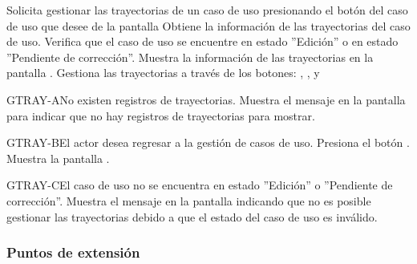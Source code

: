 \begin{UCtrayectoria}
	\UCpaso[\UCactor] Solicita gestionar las trayectorias de un caso de uso presionando el botón  del caso de uso que desee de la pantalla 
	\UCpaso[\UCsist] Obtiene la información de las trayectorias del caso de uso. 
	\UCpaso[\UCsist] Verifica que el caso de uso se encuentre en estado ''Edición'' o en estado ''Pendiente de corrección''.
	\UCpaso[\UCsist] Muestra la información de las trayectorias en la pantalla . 
	\UCpaso[\UCactor] Gestiona las trayectorias a través de los botones: , \editar, y \eliminar {} \label{CU12.1.1-P5}
\end{UCtrayectoria}		
\begin{UCtrayectoriaA}{GTRAY-A}{No existen registros de trayectorias.}
	\UCpaso[\UCsist] Muestra el mensaje  en la pantalla  para indicar que no hay registros de trayectorias para mostrar.
\end{UCtrayectoriaA}

\begin{UCtrayectoriaA}{GTRAY-B}{El actor desea regresar a la gestión de casos de uso.}
	\UCpaso[\UCactor] Presiona el botón .
	\UCpaso[\UCsist] Muestra la pantalla .
\end{UCtrayectoriaA}

\begin{UCtrayectoriaA}{GTRAY-C}{El caso de uso no se encuentra en estado ''Edición'' o ''Pendiente de corrección''.}
	\UCpaso[\UCsist] Muestra el mensaje  en la pantalla  indicando que no es posible gestionar las trayectorias debido a que el estado del caso de uso es inválido.
\end{UCtrayectoriaA}


\subsubsection{Puntos de extensión}

